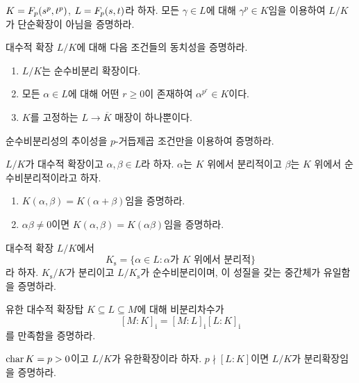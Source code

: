 \begin{exercise}[*]
$K=F_p(s^p,t^p)$, $L=F_p(s,t)$라 하자. 모든 $\gamma\in L$에 대해 $\gamma^p\in K$임을 이용하여 $L/K$가 단순확장이 아님을 증명하라.
\end{exercise}

\begin{exercise}
대수적 확장 $L/K$에 대해 다음 조건들의 동치성을 증명하라.
\begin{enumerate}[label=(\roman*)]
  \item $L/K$는 순수비분리 확장이다.
  \item 모든 $\alpha\in L$에 대해 어떤 $r\ge0$이 존재하여 $\alpha^{p^r}\in K$이다.
  \item $K$를 고정하는 $L\to\overline K$ 매장이 하나뿐이다.
\end{enumerate}
\end{exercise}

\begin{exercise}
순수비분리성의 추이성을 $p$-거듭제곱 조건만을 이용하여 증명하라.
\end{exercise}

\begin{exercise}[*]
$L/K$가 대수적 확장이고 $\alpha,\beta\in L$라 하자. $\alpha$는 $K$ 위에서 분리적이고 $\beta$는 $K$ 위에서 순수비분리적이라고 하자.
\begin{enumerate}[label=(\alph*)]
  \item $K(\alpha,\beta)=K(\alpha+\beta)$임을 증명하라.
  \item $\alpha\beta\ne0$이면 $K(\alpha,\beta)=K(\alpha\beta)$임을 증명하라.
\end{enumerate}
\end{exercise}

\begin{exercise}[*]
대수적 확장 $L/K$에서
\[
  K_{\mathrm s}=\{\alpha\in L:\alpha\text{가 }K\text{ 위에서 분리적}\}
\]
라 하자. $K_{\mathrm s}/K$가 분리이고 $L/K_{\mathrm s}$가 순수비분리이며, 이 성질을 갖는 중간체가 유일함을 증명하라.
\end{exercise}

\begin{exercise}
유한 대수적 확장탑 $K\subseteq L\subseteq M$에 대해 비분리차수가
\[
  [M:K]_{\mathrm i}
  =[M:L]_{\mathrm i}[L:K]_{\mathrm i}
\]
를 만족함을 증명하라.
\end{exercise}

\begin{exercise}
$\operatorname{char} K=p>0$이고 $L/K$가 유한확장이라 하자. $p\nmid[L:K]$이면 $L/K$가 분리확장임을 증명하라.
\end{exercise}


